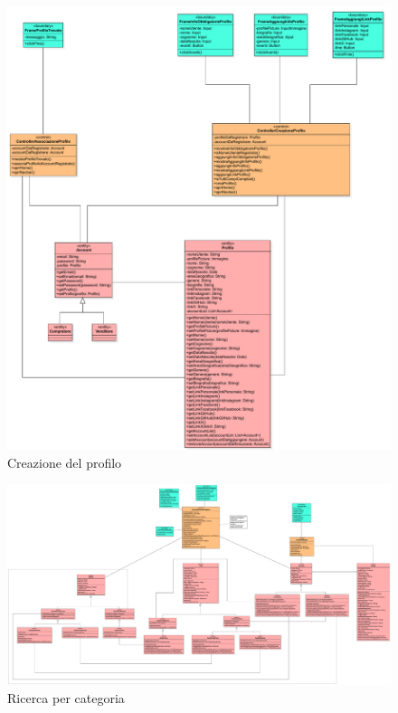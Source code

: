         \begin{figure}[htbp!]
            \centering
                \includegraphics[width=1\linewidth]{Immagini/Diagrammi/Class Diagram/Analisi/Utente che non ha effettuato l'accesso/CreazioneProfilo.pdf}
            \caption{Creazione del profilo}
        \end{figure}
        
        \begin{figure}[htbp!]
            \centering
                \includegraphics[width=1\linewidth]{Immagini/Diagrammi/Class Diagram/Analisi/Utente generico/RicercaCategoria.pdf}
            \caption{Ricerca per categoria}
        \end{figure}
        
